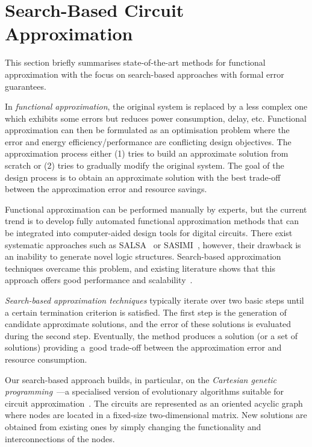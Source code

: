 \documentclass[runningheads]{llncs}
\begin{document}
\section{Search-Based Circuit Approximation}

This section briefly summarises state-of-the-art methods for functional approximation with the focus on search-based approaches with formal error guarantees. 

\vspace{0.5em} In \emph{functional approximation}, the original system is
replaced by a less complex one which exhibits some errors but reduces power
consumption, delay, etc. Functional approximation can then be formulated as an
optimisation problem where the error and energy  efficiency/performance are
conflicting design objectives. The approximation process either (1) tries to
build an approximate solution from scratch or (2) tries to gradually modify the
original system. The goal of the design process is to obtain an approximate
solution with the best trade-off between the approximation error and resource
savings.

Functional approximation can be performed manually by experts, but the current
trend is to develop fully automated functional approximation methods that can be
integrated into computer-aided design tools for digital circuits. There exist
systematic approaches such as SALSA~\cite{SALSA} or SASIMI~\cite{SASIMI},
however, their drawback is an inability to generate novel logic structures.
Search-based approximation techniques overcame this problem, and existing
literature shows that this approach offers good performance and
scalability~\cite{mrazek:date:17}.

\vspace{0.5em} \emph{Search-based approximation techniques} typically iterate
over two basic steps until a certain termination criterion is satisfied. The
first step is the generation of candidate approximate solutions, and the error
of these solutions is evaluated during the second step. Eventually, the method
produces a solution (or a set of solutions) providing a~good trade-off between
the approximation error and resource consumption. 

Our search-based approach builds, in particular, on the \emph{Cartesian genetic
programming}~\cite{miller:cgp:book}---a specialised version of evolutionary
algorithms suitable for circuit approximation~\cite{approx-So-Mo-CGP'15}. The
circuits are represented as an oriented acyclic graph where nodes are located in
a fixed-size two-dimensional matrix. New solutions are obtained from existing
ones by simply changing the functionality and interconnections of the nodes.
\end{document}
